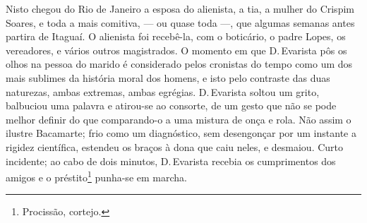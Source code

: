 Nisto chegou do Rio de Janeiro a esposa do alienista, a tia, a mulher do
Crispim Soares, e toda a mais comitiva, --- ou quase toda ---, que
algumas semanas antes partira de Itaguaí. O alienista foi recebê-la, com
o boticário, o padre Lopes, os vereadores, e vários outros magistrados.
O momento em que D.\,Evarista pôs os olhos na pessoa do marido é
considerado pelos cronistas do tempo como um dos mais sublimes da
história moral dos homens, e isto pelo contraste das duas naturezas,
ambas extremas, ambas egrégias. D.\,Evarista soltou um grito, balbuciou
uma palavra e atirou-se ao consorte, de um gesto que não se pode melhor
definir do que comparando-o a uma mistura de onça e rola. Não assim o
ilustre Bacamarte; frio como um diagnóstico, sem desengonçar por um
instante a rigidez científica, estendeu os braços à dona que caiu neles,
e desmaiou. Curto incidente; ao cabo de dois minutos, D.\,Evarista
recebia os cumprimentos dos amigos e o préstito\footnote{Procissão,
  cortejo.} punha-se em marcha.

